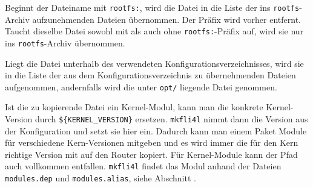 \begin{enumerate}
        Beginnt der Dateiname mit \texttt{rootfs:}, wird die Datei in die Liste
        der ins \texttt{rootfs}-Archiv aufzunehmenden Dateien übernommen. Der
        Präfix wird vorher entfernt. Taucht dieselbe Datei sowohl mit als auch
        ohne \texttt{rootfs:}-Präfix auf, wird sie nur ins
        \texttt{rootfs}-Archiv übernommen.

        Liegt die Datei unterhalb des verwendeten Konfigurationsverzeichnisses,
        wird sie in die Liste der aus dem Konfigurationsverzeichnis zu
        übernehmenden Dateien aufgenommen, andernfalls wird die unter
        \texttt{opt/} liegende Datei genommen.

        Ist die zu kopierende Datei ein Kernel-Modul, kann man die
        konkrete Kernel-Version durch \texttt{\$\{KERNEL\_VERSION\}} ersetzen.
        \texttt{mkfli4l} nimmt dann die Version aus der Konfiguration und setzt
        sie hier ein. Dadurch kann man einem Paket Module für verschiedene
        Kern-Versionen mitgeben und es wird immer die für den Kern richtige
        Version mit auf den Router kopiert.
        Für Kernel-Module kann der Pfad auch vollkommen entfallen.
        \texttt{mkfli4l} findet das Modul anhand der Dateien
        \texttt{modules.dep} und \texttt{modules.alias}, siehe Abschnitt
        .


\end{enumerate}
